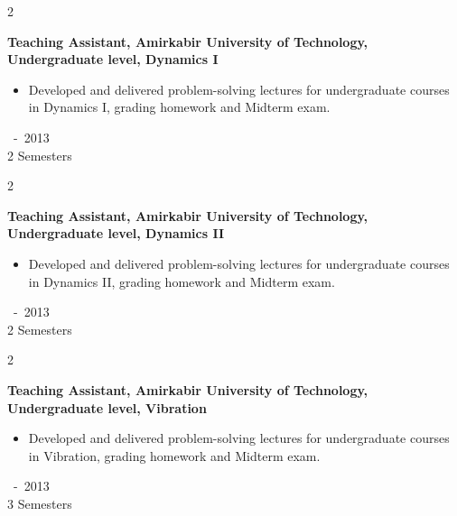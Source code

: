 \documentclass[10pt, letterpaper]{article}
\newenvironment{highlights}{
    \begin{itemize}[
        topsep=0.10 cm,
        parsep=0.10 cm,
        partopsep=0pt,
        itemsep=0pt,
        leftmargin=0.2 cm + 10pt
    ]
}{
    \end{itemize}
} %
\newenvironment{twocolentry}[2][]{
    \onecolentry
    \def\secondColumn{#2}
    \setcolumnwidth{\fill, 2.8 cm}
    \begin{paracol}{2}
}{
    \switchcolumn \raggedleft \secondColumn
    \end{paracol}
    \endonecolentry
} %
\begin{document}
\begin{twocolentry}{
        2010~-~2013\\ 
        2 Semesters\\
        }
            \textbf{{{Teaching Assistant, 
            Amirkabir University of Technology, Undergraduate level, Dynamics I}}}\\
\vspace{-1em}
            \begin{highlights}

                 \item Developed and delivered problem-solving lectures for undergraduate courses in Dynamics I, grading homework and Midterm exam.
        \end{highlights}
\end{twocolentry}
\begin{twocolentry}{
        2010~-~2013\\ 
        2 Semesters\\
        }
            \textbf{{{Teaching Assistant, 
            Amirkabir University of Technology, Undergraduate level, Dynamics II}}}\\
\vspace{-1em}
            \begin{highlights}

                 \item Developed and delivered problem-solving lectures for undergraduate courses in Dynamics II, grading homework and Midterm exam.
        \end{highlights}
\end{twocolentry}
\begin{twocolentry}{
        2009~-~2013\\ 
        3 Semesters\\
        }
            \textbf{{{Teaching Assistant, 
            Amirkabir University of Technology, Undergraduate level, Vibration}}}\\
\vspace{-1em}
            \begin{highlights}

                 \item Developed and delivered problem-solving lectures for undergraduate courses in Vibration, grading homework and Midterm exam.
        \end{highlights}
\end{twocolentry}
\end{document}
